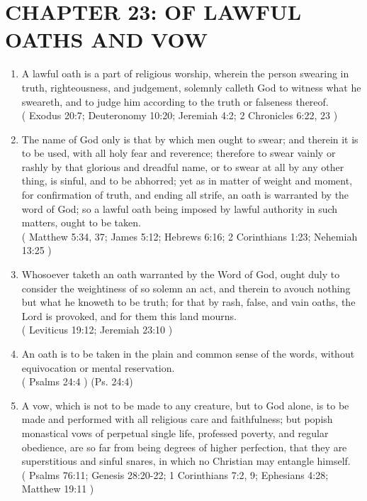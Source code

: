 \documentclass[12pt,a4paper]{book}
\begin{document}
\chapter{CHAPTER 23: OF LAWFUL OATHS AND VOW}
\label{ch-law-oat-vow}
\begin{enumerate}
\item A lawful oath is a part of religious worship, wherein the person swearing in truth, righteousness, and judgement, solemnly calleth God to witness what he sweareth, and to judge him according to the truth or falseness thereof.\\
( Exodus 20:7; Deuteronomy 10:20; Jeremiah 4:2; 2 Chronicles 6:22, 23 )
\item The name of God only is that by which men ought to swear; and therein it is to be used, with all holy fear and reverence; therefore to swear vainly or rashly by that glorious and dreadful name, or to swear at all by any other thing, is sinful, and to be abhorred; yet as in matter of weight and moment, for confirmation of truth, and ending all strife, an oath is warranted by the word of God; so a lawful oath being imposed by lawful authority in such matters, ought to be taken.\\
( Matthew 5:34, 37; James 5:12; Hebrews 6:16; 2 Corinthians 1:23; Nehemiah 13:25 )
\item Whosoever taketh an oath warranted by the Word of God, ought duly to consider the weightiness of so solemn an act, and therein to avouch nothing but what he knoweth to be truth; for that by rash, false, and vain oaths, the Lord is provoked, and for them this land mourns.\\
( Leviticus 19:12; Jeremiah 23:10 )
\item An oath is to be taken in the plain and common sense of the words, without equivocation or mental reservation.\\
( Psalms 24:4 ) (Ps. 24:4)
\item A vow, which is not to be made to any creature, but to God alone, is to be made and performed with all religious care and faithfulness; but popish monastical vows of perpetual single life, professed poverty, and regular obedience, are so far from being degrees of higher perfection, that they are superstitious and sinful snares, in which no Christian may entangle himself.\\
( Psalms 76:11; Genesis 28:20-22; 1 Corinthians 7:2, 9; Ephesians 4:28; Matthew 19:11 )
\end{enumerate}
\end{document}
